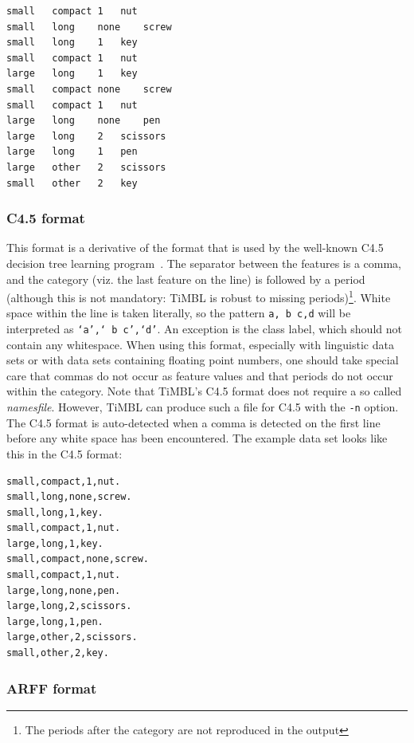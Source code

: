 \documentclass{book}
\begin{document}
\begin{footnotesize}
\begin{verbatim}
small	compact	1	nut
small	long	none	screw
small	long	1	key
small	compact	1	nut
large	long	1	key
small	compact	none	screw
small	compact	1	nut
large	long	none	pen
large	long	2	scissors
large	long	1	pen
large	other	2	scissors
small	other	2	key
\end{verbatim}
\end{footnotesize}

\subsubsection{C4.5 format}
\label{c45format}

This format is a derivative of the format that is used by the
well-known C4.5 decision tree learning program~\cite{Quinlan93}.  The
separator between the features is a comma, and the category (viz.  the
last feature on the line) is followed by a period (although this is
not mandatory: TiMBL is robust to missing periods)\footnote{The
periods after the category are not reproduced in the output}.  White
space within the line is taken literally, so the pattern {\tt a,\ b\
c,d} will be interpreted as {\tt `a',`\ b\ c',`d'}. An exception is the
class label, which should not contain any whitespace. When using this
format, especially with linguistic data sets or with data sets
containing floating point numbers, one should take special care that
commas do not occur as feature values and that periods do not
occur within the category.  Note that TiMBL's C4.5 format does not
require a so called {\em namesfile}.  However, TiMBL can produce such
a file for C4.5 with the {\tt -n} option.  The C4.5 format is
auto-detected when a comma is detected on the first line before
any white space has been encountered. The example data set looks like
this in the C4.5 format:

\begin{footnotesize}
\begin{verbatim}
small,compact,1,nut.
small,long,none,screw.
small,long,1,key.
small,compact,1,nut.
large,long,1,key.
small,compact,none,screw.
small,compact,1,nut.
large,long,none,pen.
large,long,2,scissors.
large,long,1,pen.
large,other,2,scissors.
small,other,2,key.
\end{verbatim}
\end{footnotesize}

\subsubsection{ARFF format}
\label{arffformat}
\end{document}
